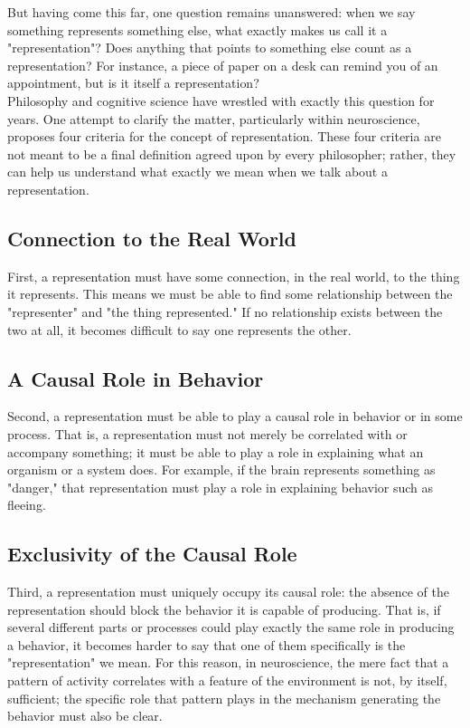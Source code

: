 But having come this far, one question remains unanswered: when we say something represents something else, what exactly makes us call it a "representation"? Does anything that points to something else count as a representation? For instance, a piece of paper on a desk can remind you of an appointment, but is it itself a representation?\\
Philosophy and cognitive science have wrestled with exactly this question for years. One attempt to clarify the matter, particularly within neuroscience, proposes four criteria for the concept of representation\autocite{baker2021representation}. These four criteria are not meant to be a final definition agreed upon by every philosopher; rather, they can help us understand what exactly we mean when we talk about a representation.\newpage

\subsection{Connection to the Real World}
\label{sub:criterion-real-world-connection}
First, a representation must have some connection, in the real world, to the thing it represents. This means we must be able to find some relationship between the "representer" and "the thing represented." If no relationship exists between the two at all, it becomes difficult to say one represents the other.
\subsection{A Causal Role in Behavior}
\label{sub:criterion-causal-role}
Second, a representation must be able to play a causal role in behavior or in some process. That is, a representation must not merely be correlated with or accompany something; it must be able to play a role in explaining what an organism or a system does. For example, if the brain represents something as "danger," that representation must play a role in explaining behavior such as fleeing.
\subsection{Exclusivity of the Causal Role}
\label{sub:criterion-exclusivity}
Third, a representation must uniquely occupy its causal role: the absence of the representation should block the behavior it is capable of producing. That is, if several different parts or processes could play exactly the same role in producing a behavior, it becomes harder to say that one of them specifically is the "representation" we mean. For this reason, in neuroscience, the mere fact that a pattern of activity correlates with a feature of the environment is not, by itself, sufficient; the specific role that pattern plays in the mechanism generating the behavior must also be clear.
